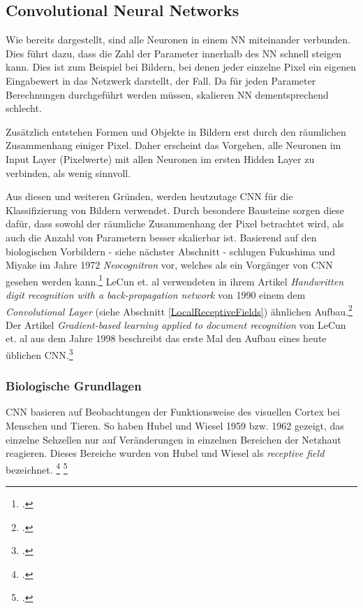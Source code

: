 \subsection{Convolutional Neural Networks} \label{sec:CNN}
Wie bereits dargestellt, sind alle Neuronen in einem \ac{NN} miteinander verbunden. Dies führt dazu, dass die Zahl der Parameter innerhalb des \ac{NN} schnell steigen kann. Dies ist zum Beispiel bei Bildern, bei denen jeder einzelne Pixel ein eigenen Eingabewert in das Netzwerk darstellt, der Fall. Da für jeden Parameter Berechnungen durchgeführt werden müssen, skalieren \ac{NN} dementsprechend schlecht.

Zusätzlich entstehen Formen und Objekte in Bildern erst durch den räumlichen Zusammenhang einiger Pixel. Daher erscheint das Vorgehen, alle Neuronen im Input Layer (Pixelwerte) mit allen Neuronen im ersten Hidden Layer zu verbinden, als wenig sinnvoll.

Aus diesen und weiteren Gründen, werden heutzutage \ac{CNN} für die Klassifizierung von Bildern verwendet. Durch besondere Bausteine sorgen diese dafür, dass sowohl der räumliche Zusammenhang der Pixel betrachtet wird, als auch die Anzahl von Parametern besser skalierbar ist. Basierend auf den biologischen Vorbildern - siehe nächster Abschnitt - schlugen Fukushima und Miyake im Jahre 1972 \textit{Neocognitron} vor, welches als ein Vorgänger von \ac{CNN} gesehen werden kann.\footcite[Vgl.][S. 267–285]{fukushima1982neocognitron} LeCun et. al verwendeten in ihrem Artikel \textit{Handwritten digit recognition with a back-propagation network} von 1990 einem dem \textit{Convolutional Layer} (siehe Abschnitt \ref{LocalReceptiveFields}) ähnlichen Aufbau.\footcite[Vgl.][S. 396–404]{lecun1990handwritten} Der Artikel \textit{Gradient-based learning applied to document recognition} von LeCun et. al aus dem Jahre 1998 beschreibt das erste Mal den Aufbau eines heute üblichen \ac{CNN}.\footcite[Vgl.][S. 2278–2324]{lecunGradientbasedLearningApplied1998}

\subsubsection{Biologische Grundlagen}
\ac{CNN} basieren auf Beobachtungen der Funktionsweise des visuellen Cortex bei Menschen und Tieren. So haben Hubel und Wiesel 1959 bzw. 1962 gezeigt, das einzelne Sehzellen nur auf Veränderungen in einzelnen Bereichen der Netzhaut reagieren. Dieses Bereiche wurden von Hubel und Wiesel als \textit{receptive field} bezeichnet. \footcite[Vgl. ][S. 574-591]{hubelReceptiveFieldsSingle1959} \footcite[Vgl. ][S. 106-154]{hubelReceptiveFieldsBinocular1962}


